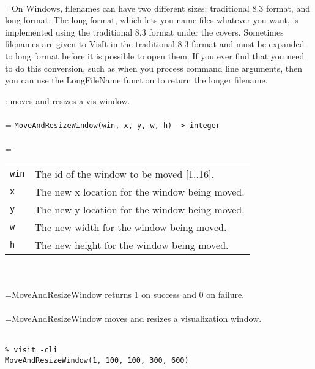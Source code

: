 \documentclass[10pt,a4paper]{report}
\begin{document}
 \\ 
\hangindent=\parindent On Windows, filenames can have two different sizes: traditional 8.3 format, and long format. The long format, which lets you name files whatever you want, is implemented using the traditional 8.3 format under the covers. Sometimes filenames are given to VisIt in the traditional 8.3 format and must be expanded to long format before it is possible to open them. If you ever find that you need to do this conversion, such as when you process command line arguments, then you can use the LongFileName function to return the longer filename. \\[-3mm] 

\newpage


{}
: moves and resizes a vis window.\\[-3mm]

 \\ 
\hangindent=\parindent 
\verb!MoveAndResizeWindow(win, x, y, w, h) -> integer!\\ [-3mm]

 \\ 
\hangindent=\parindent 
\begin{tabular}{lp{9cm}}
\verb!win! & The id of the window to be moved [1..16]. \\
\verb!x! & The new x location for the window being moved. \\
\verb!y! & The new y location for the window being moved. \\
\verb!w! & The new width for the window being moved. \\
\verb!h! & The new height for the window being moved. \\
\end{tabular} \\[-2mm]


 \\ 
\hangindent=\parindent MoveAndResizeWindow returns 1 on success and 0 on failure. \\[-3mm] 

 \\ 
\hangindent=\parindent MoveAndResizeWindow moves and resizes a visualization window. \\[-3mm] 

\\[-6mm]
\begin{verbatim}% visit -cli
MoveAndResizeWindow(1, 100, 100, 300, 600)
\end{verbatim}
\newpage
\end{document}
